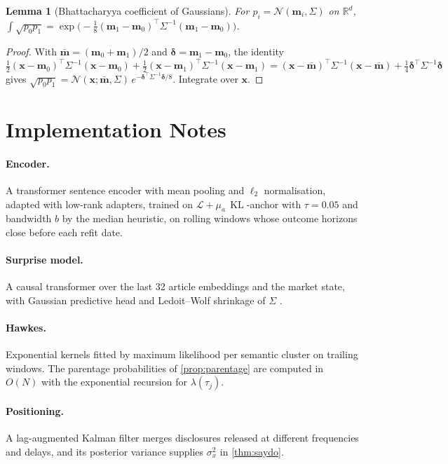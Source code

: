 \documentclass[11pt,a4paper]{article}
\theoremstyle{plain}
\newtheorem{lemma}[theorem]{Lemma}
\theoremstyle{definition}
\theoremstyle{remark}
\newcommand{\R}{\mathbb{R}}
\newcommand{\N}{\mathcal{N}}
\DeclareMathOperator{\KL}{KL}
\begin{document}
\begin{lemma}[Bhattacharyya coefficient of Gaussians]\label{lem:bc}
For $p_i=\N(\bm m_i,\Sigma)$ on $\R^d$, $\int\sqrt{p_0p_1}=\exp\big(-\tfrac18(\bm m_1-\bm m_0)^\top\Sigma^{-1}(\bm m_1-\bm m_0)\big)$.
\end{lemma}
\begin{proof}
With $\bar{\bm m}=(\bm m_0+\bm m_1)/2$ and $\bm\delta=\bm m_1-\bm m_0$, the identity $\tfrac12(\bm x-\bm m_0)^\top\Sigma^{-1}(\bm x-\bm m_0)+\tfrac12(\bm x-\bm m_1)^\top\Sigma^{-1}(\bm x-\bm m_1)=(\bm x-\bar{\bm m})^\top\Sigma^{-1}(\bm x-\bar{\bm m})+\tfrac14\bm\delta^\top\Sigma^{-1}\bm\delta$ gives $\sqrt{p_0p_1}=\N(\bm x;\bar{\bm m},\Sigma)\,e^{-\bm\delta^\top\Sigma^{-1}\bm\delta/8}$. Integrate over $\bm x$.
\end{proof}

\section{Implementation Notes}\label{app:impl}

\paragraph{Encoder.} A transformer sentence encoder \citep{reimers2019} with mean pooling and $\ell_2$ normalisation, adapted with low-rank adapters, trained on $\mathcal{L}+\mu_a\,\KL$-anchor with $\tau=0.05$ and bandwidth $b$ by the median heuristic, on rolling windows whose outcome horizons close before each refit date.

\paragraph{Surprise model.} A causal transformer over the last 32 article embeddings and the market state, with Gaussian predictive head and Ledoit--Wolf shrinkage of $\Sigma$ \citep{ledoit2004}.

\paragraph{Hawkes.} Exponential kernels fitted by maximum likelihood per semantic cluster on trailing windows. The parentage probabilities of \cref{prop:parentage} are computed in $O(N)$ with the exponential recursion for $\lambda(\tau_j)$.

\paragraph{Positioning.} A lag-augmented Kalman filter merges disclosures released at different frequencies and delays, and its posterior variance supplies $\sigma_x^2$ in \cref{thm:saydo}.
\end{document}
